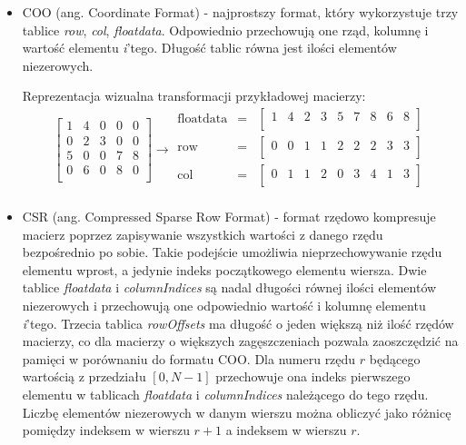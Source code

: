 \begin{itemize}
    \item COO (ang. Coordinate Format) - najprostszy format, który wykorzystuje trzy tablice \textit{row}, \textit{col}, \textit{floatdata}.
    Odpowiednio przechowują one rząd, kolumnę i wartość elementu \textit{i}'tego.
    Długość tablic równa jest ilości elementów niezerowych.

    Reprezentacja wizualna transformacji przykładowej macierzy:
    \[
\left[
\begin{array}{ccccc}
    1 & 4 & 0 & 0 & 0\\ 
    0 & 2 & 3 & 0 & 0\\ 
    5 & 0 & 0 & 7 & 8\\ 
    0 & 6 & 0 & 8 & 0\\ 
\end{array}
\right]
\rightarrow
\begin{matrix}
\text{floatdata} & = & \begin{bmatrix}
1 & 4 & 2 & 3 & 5 & 7 & 8 & 6 & 8 \\
\end{bmatrix} \\
\text{row} & = & \begin{bmatrix}
0 & 0 & 1 & 1 & 2 & 2 & 2 & 3 & 3 \\
\end{bmatrix} \\
\text{col} & = & \begin{bmatrix}
0 & 1 & 1 & 2 & 0 & 3 & 4 & 1 & 3 \\
\end{bmatrix} \\
\end{matrix}
\]
    
    \item CSR (ang. Compressed Sparse Row Format) - format rzędowo kompresuje macierz poprzez zapisywanie wszystkich wartości z danego rzędu bezpośrednio po sobie.
    Takie podejście umożliwia nieprzechowywanie rzędu elementu wprost, a jedynie indeks początkowego elementu wiersza.
    Dwie tablice \textit{floatdata} i \textit{columnIndices} są nadal długości równej ilości elementów niezerowych i przechowują one odpowiednio wartość i kolumnę elementu \textit{i}'tego.
    Trzecia tablica \textit{rowOffsets} ma długość o jeden większą niż ilość rzędów macierzy, co dla macierzy o większych zagęszczeniach pozwala zaoszczędzić na pamięci w porównaniu do formatu COO.
    Dla numeru rzędu $r$ będącego wartością z przedziału $[0, N-1]$ przechowuje ona indeks pierwszego elementu w tablicach \textit{floatdata} i \textit{columnIndices} należącego do tego rzędu.
    Liczbę elementów niezerowych w danym wierszu można obliczyć jako różnicę pomiędzy indeksem w wierszu $r+1$ a indeksem w wierszu $r$.


\end{itemize}
